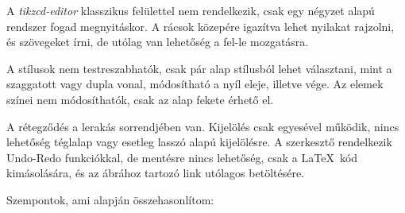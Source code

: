 A \textit{tikzcd-editor} klasszikus felülettel nem rendelkezik, csak egy négyzet alapú rendszer fogad megnyitáskor. A rácsok közepére igazítva lehet nyilakat rajzolni, és szövegeket írni, de utólag van lehetőség a fel-le mozgatásra. 

A stílusok nem testreszabhatók, csak pár alap stílusból lehet választani, mint a szaggatott vagy dupla vonal, módosítható a nyíl eleje, illetve vége. Az elemek színei nem módosíthatók, csak az alap fekete érhető el. 

A rétegződés a lerakás sorrendjében van. Kijelölés csak egyesével működik, nincs lehetőség téglalap vagy esetleg lasszó alapú kijelölésre. A szerkesztő rendelkezik Undo-Redo funkciókkal, de mentésre nincs lehetőség, csak a \LaTeX\ kód kimásolására, és az ábrához tartozó link utólagos betöltésére.



Szempontok, ami alapján összehasonlítom:

